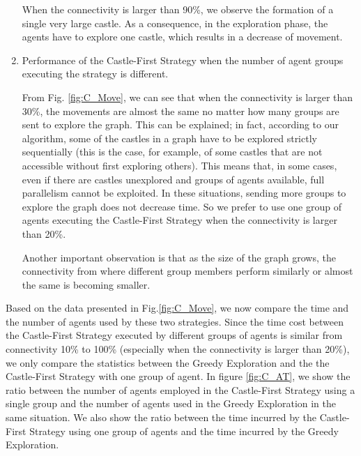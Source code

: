 \begin{enumerate}
When the connectivity is larger than 90\%,  we observe the formation of a single very large castle.
As a consequence,  in the exploration phase, the agents have to explore one castle, which results in a decrease of movement.  


\item Performance of the {\sc Castle-First} Strategy when the number of agent groups executing the strategy is different. 

From   Fig. \ref{fig:C_Move}, we can see that when the connectivity is larger than 30\%, the movements are almost the same no matter how many groups are sent to explore the graph. This can be explained; in fact,
  according to our algorithm, some of the castles in a graph have to be explored strictly sequentially (this is the case, for example, of some castles that are not accessible without first exploring others). 
This means that,  in some cases, even if there are castles unexplored and groups of agents available, full parallelism cannot be exploited.  In these situations,  sending more groups to explore the graph does not decrease time. So we prefer to use one group of agents executing the {\sc Castle-First} Strategy when the connectivity is larger than 20\%.

Another important observation is that as the size of the graph grows, the connectivity from where different group members perform similarly or almost the same is becoming smaller.


\end{enumerate} 

Based on the data presented in Fig.\ref{fig:C_Move}, we now compare the time and the number of agents used by these two strategies. Since the time cost between the {\sc Castle-First} Strategy executed by different groups of agents is similar from connectivity 10\% to 100\% (especially when the connectivity is larger than 20\%),  we only compare the statistics between the {\sc Greedy} Exploration and the the {\sc Castle-First} Strategy with one group of agent. 
In figure \ref{fig:C_AT}, we show the ratio between the number of agents employed in the {\sc Castle-First} Strategy using a single group and the number of agents used in the {\sc Greedy} Exploration in the same situation.
We also show the ratio between the time incurred by the {\sc Castle-First} Strategy using one group of agents and the time incurred by the {\sc Greedy} Exploration.


